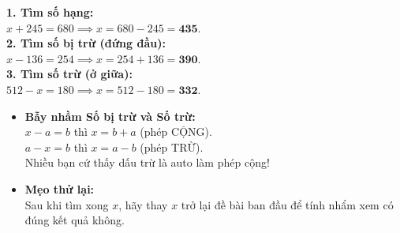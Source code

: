 \documentclass[12pt,a4paper]{article}
\begin{document}
\vspace{-2.5mm}
\noindent
\begin{minipage}[t]{0.49\textwidth}\vspace{0pt}
\begin{tcolorbox}[
  enhanced,
  colback=green!4!white,
  colframe=green!60!black,
  arc=2mm, boxrule=0.8pt,
  left=2mm, right=2mm, top=1.8mm, bottom=1.8mm,
  title={\footnotesize\bfseries\color{white}\faCheckCircle\ Ví dụ thực hành chuẩn mực}
]
{\footnotesize
\textbf{1. Tìm số hạng:}\\
$x + 245 = 680 \implies x = 680 - 245 = \mathbf{435}$.\\
\textbf{2. Tìm số bị trừ (đứng đầu):}\\
$x - 136 = 254 \implies x = 254 + 136 = \mathbf{390}$.\\
\textbf{3. Tìm số trừ (ở giữa):}\\
$512 - x = 180 \implies x = 512 - 180 = \mathbf{332}$.
}
\end{tcolorbox}
\end{minipage}
\hfill
\begin{minipage}[t]{0.49\textwidth}\vspace{0pt}
\begin{tcolorbox}[
  enhanced,
  colback=red!4!white,
  colframe=red!70!black,
  arc=2mm, boxrule=0.8pt,
  left=2mm, right=2mm, top=1.8mm, bottom=1.8mm,
  title={\footnotesize\bfseries\color{white}\faExclamationTriangle\ Mẹo tránh bẫy trắc nghiệm}
]
{\footnotesize
\begin{itemize}\setlength{\itemsep}{1.5pt}\setlength{\leftskip}{-2.5mm}
  \item \textbf{Bẫy nhầm Số bị trừ và Số trừ:}\\
  $x - a = b$ thì $x = b + a$ (phép CỘNG).\\
  $a - x = b$ thì $x = a - b$ (phép TRỪ).\\
  Nhiều bạn cứ thấy dấu trừ là auto làm phép cộng!
  \item \textbf{Mẹo thử lại:}\\
  Sau khi tìm xong $x$, hãy thay $x$ trở lại đề bài ban đầu để tính nhẩm xem có đúng kết quả không.
\end{itemize}
}
\end{tcolorbox}
\end{minipage}
\end{document}

